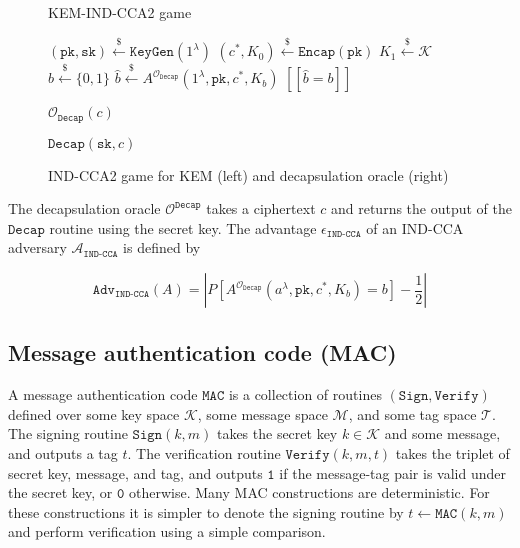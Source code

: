 \documentclass[journal=tches,submission]{iacrtrans}
\newcommand{\keygen}{\texttt{KeyGen}}
\newcommand{\encap}{\texttt{Encap}}
\newcommand{\decap}{\texttt{Decap}}
\newcommand{\mac}{\texttt{MAC}}
\newcommand{\sign}{\texttt{Sign}}
\newcommand{\verify}{\texttt{Verify}}
\newcommand{\pk}{\texttt{pk}}
\newcommand{\sk}{\texttt{sk}}
\newcommand{\leftsample}{\stackrel{\$}{\leftarrow}}
\newcommand{\llbrack}{[\![}
\newcommand{\rrbrack}{]\!]}
\newcommand{\norm}[1]{\left\lvert #1 \right\rvert}
\newcommand{\adv}{\texttt{Adv}}
\begin{document}
\begin{figure}[H]
    \centering
    \begin{minipage}[b]{0.49\textwidth}
        \begin{algorithm}[H]
            \caption*{KEM-IND-CCA2 game}
            \begin{algorithmic}[1]
                \State $(\pk, \sk) \leftsample \keygen(1^\lambda)$
                \State $(c^\ast, K_0) \leftsample \encap(\pk)$
                \State $K_1 \leftsample \mathcal{K}$
                \State $b \leftsample \{0, 1\}$
                \State $\hat{b} \leftsample A^{\mathcal{O}_\decap}(
                    1^\lambda, \pk, c^\ast, K_b
                )$
                \State \Return $\llbrack \hat{b} = b \rrbrack$
            \end{algorithmic}
        \end{algorithm}
    \end{minipage}\hfill
    \begin{minipage}[b]{0.49\textwidth}
        \begin{algorithm}[H]
        \caption*{$\mathcal{O}_\decap(c)$}
        \begin{algorithmic}[1]
            \State \Return $\decap(\sk, c)$
        \end{algorithmic}
        \end{algorithm}
    \end{minipage}
    \caption{IND-CCA2 game for KEM (left) and decapsulation oracle (right)}\label{fig:kem-game}
\end{figure}


The decapsulation oracle $\mathcal{O}^\decap$ takes a ciphertext $c$ and returns the output of the $\decap$ routine using the secret key. The advantage $\epsilon_\texttt{IND-CCA}$ of an IND-CCA adversary $\mathcal{A}_\texttt{IND-CCA}$ is defined by

\begin{equation*}
    \adv_\texttt{IND-CCA}(A) = \norm{
        P[A^{\mathcal{O}_\decap}(a^\lambda, \pk, c^\ast, K_b) = b] - \frac{1}{2}
    }
\end{equation*}

\subsection{Message authentication code (MAC)}\label{sec:message-authentication-code}
A message authentication code $\mac$ is a collection of routines $(\sign, \verify)$ defined over some key space $\mathcal{K}$, some message space $\mathcal{M}$, and some tag space $\mathcal{T}$. The signing routine $\sign(k, m)$ takes the secret key $k \in \mathcal{K}$ and some message, and outputs a tag $t$. The verification routine $\verify(k, m, t)$ takes the triplet of secret key, message, and tag, and outputs $\texttt{1}$ if the message-tag pair is valid under the secret key, or $\texttt{0}$ otherwise. Many MAC constructions are deterministic. For these constructions it is simpler to denote the signing routine by $t \leftarrow \mac(k, m)$ and perform verification using a simple comparison.
\end{document}
